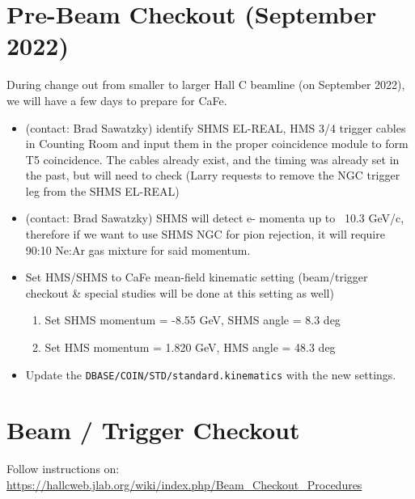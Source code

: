 \documentclass{article}
\begin{document}
    


\section{Pre-Beam Checkout (September 2022)}
 During change out from smaller to larger Hall C beamline (on September 2022), we will have a few days to prepare for CaFe.
 \begin{itemize}
 \item (contact: Brad Sawatzky) identify SHMS EL-REAL, HMS 3/4 trigger cables in Counting Room and input them
 in the proper coincidence module to form T5 coincidence. The cables already
 exist, and the timing was already set in the past, but will need to check
 (Larry requests to remove the NGC trigger leg from the SHMS EL-REAL)

\item (contact: Brad Sawatzky) SHMS will detect e- momenta up to ~10.3 GeV/c, therefore if we want to use SHMS NGC for pion rejection, it will require ~ 90:10 Ne:Ar gas mixture for said momentum.

\item Set HMS/SHMS to CaFe mean-field kinematic setting (beam/trigger checkout \& special studies will be done at this setting as well) 

    \begin{enumerate}
    \item Set SHMS momentum = -8.55 GeV, SHMS angle = 8.3 deg  
    \item Set HMS momentum = 1.820 GeV, HMS angle = 48.3 deg
    \end{enumerate}
 
\item Update the \texttt{DBASE/COIN/STD/standard.kinematics} with the new settings.
\end{itemize}

\section{Beam / Trigger Checkout}
Follow instructions on: \url{https://hallcweb.jlab.org/wiki/index.php/Beam_Checkout_Procedures}\\
\end{document}
